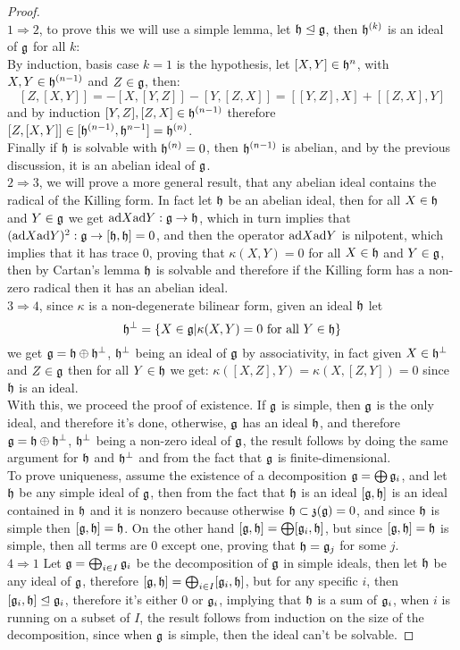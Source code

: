 \begin{proof}\\
$1 \Rightarrow 2$, to prove this we will use a simple lemma, let $\mathfrak{h} \trianglelefteq \mathfrak{g}$, then $\mathfrak{h}^{(k)}$ is an ideal of $\mathfrak{g}$ for all $k$:\\
By induction, basis case $k=1$ is the hypothesis, let $[X,Y] \in \mathfrak{h}^{n}$, with $X,Y \in \mathfrak{h}^{(n-1)}$ and $Z \in \mathfrak{g}$, then:
$$[Z,[X,Y]] = -[X,[Y,Z]]-[Y,[Z,X]] = [[Y,Z],X] + [[Z,X],Y]$$
and by induction $[Y,Z],[Z,X]\in \mathfrak{h}^{(n-1)}$ therefore $[Z,[X,Y]] \in [\mathfrak{h}^{(n-1)},\mathfrak{h}^{n-1}] = \mathfrak{h}^{(n)}$.\\
Finally if $\mathfrak{h}$ is solvable with $\mathfrak{h}^{(n)}=0$, then $\mathfrak{h}^{(n-1)}$ is abelian, and by the previous discussion, it is an abelian ideal of $\mathfrak{g}$.\\
$2 \Rightarrow 3$, we will prove a more general result, that any abelian ideal contains the radical of the Killing form. In fact let $\mathfrak{h}$ be an abelian ideal, then for all $X \in \mathfrak{h}$ and $Y \in \mathfrak{g}$ we get $\text{ad} X \text{ad} Y : \mathfrak{g} \rightarrow \mathfrak{h}$, which in turn implies that $(\text{ad} X \text{ad} Y)^2 : \mathfrak{g} \rightarrow [\mathfrak{h},\mathfrak{h}] = 0$, and then the operator $\text{ad} X \text{ad} Y$ is nilpotent, which implies that it has trace $0$, proving that $\kappa(X,Y)=0$ for all $X \in \mathfrak{h}$ and $Y \in \mathfrak{g}$, then by Cartan's lemma $\mathfrak{h}$ is solvable and therefore if the Killing form has a non-zero radical then it has an abelian ideal.\\
$3 \Rightarrow 4$, since $\kappa$ is a non-degenerate bilinear form, given an ideal $\mathfrak{h}$ let $$\mathfrak{h}^\perp = \{X \in \mathfrak{g} | \kappa(X,Y)=0 \text{ for all } Y \in \mathfrak{h}\}$$ we get $\mathfrak{g} = \mathfrak{h} \oplus \mathfrak{h}^\perp$, $\mathfrak{h}^\perp$ being an ideal of $\mathfrak{g}$ by associativity, in fact given $X\in \mathfrak{h}^\perp$ and $Z \in \mathfrak{g}$ then for all $Y \in \mathfrak{h}$ we get: $\kappa([X,Z],Y) = \kappa(X,[Z,Y])=0$ since $\mathfrak{h}$ is an ideal.\\
With this, we proceed the proof of existence. If $\mathfrak{g}$ is simple, then $\mathfrak{g}$ is the only ideal, and therefore it's done, otherwise, $\mathfrak{g}$ has an ideal $\mathfrak{h}$, and therefore $\mathfrak{g} = \mathfrak{h} \oplus \mathfrak{h}^\perp$, $\mathfrak{h}^\perp$ being a non-zero ideal of $\mathfrak{g}$, the result follows by doing the same argument for $\mathfrak{h}$ and $\mathfrak{h}^\perp$ and from the fact that $\mathfrak{g}$ is finite-dimensional.\\
To prove uniqueness, assume the existence of a decomposition $\mathfrak{g} = \bigoplus \mathfrak{g}_i$, and let $\mathfrak{h}$ be any simple ideal of $\mathfrak{g}$, then from the fact that $\mathfrak{h}$ is an ideal $[\mathfrak{g},\mathfrak{h}]$ is an ideal contained in $\mathfrak{h}$ and it is nonzero because otherwise $\mathfrak{h}\subset \mathfrak{z}(\mathfrak{g})=0$, and since $\mathfrak{h}$ is simple then $[\mathfrak{g},\mathfrak{h}]=\mathfrak{h}$. On the other hand $[\mathfrak{g},\mathfrak{h}]=\bigoplus[\mathfrak{g}_i,\mathfrak{h}]$, but since $[\mathfrak{g},\mathfrak{h}]=\mathfrak{h}$ is simple, then all terms are $0$ except one, proving that $\mathfrak{h}=\mathfrak{g}_j$ for some $j$.\\
$4 \Rightarrow 1$ Let $\mathfrak{g}= \bigoplus_{i \in I} \mathfrak{g}_i$ be the decomposition of $\mathfrak{g}$ in simple ideals, then let $\mathfrak{h}$ be any ideal of $\mathfrak{g}$, therefore $[\mathfrak{g},\mathfrak{h}] = \bigoplus_{i \in I} [\mathfrak{g}_i,\mathfrak{h}]$, but for any specific $i$, then $[\mathfrak{g}_i,\mathfrak{h}]\trianglelefteq \mathfrak{g}_i$, therefore it's either $0$ or $\mathfrak{g}_i$, implying that $\mathfrak{h}$ is a sum of $\mathfrak{g}_i$, when $i$ is running on a subset of $I$, the result follows from induction on the size of the decomposition, since when $\mathfrak{g}$ is simple, then the ideal can't be solvable.
\end{proof}